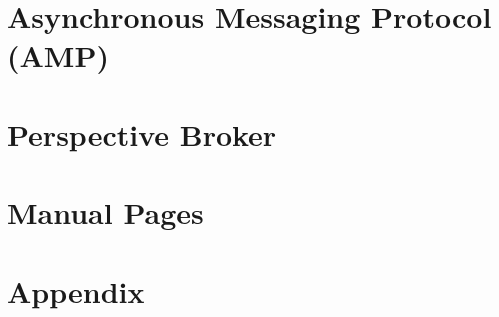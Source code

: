 \documentclass[oneside]{book}
\begin{document}








\chapter{Asynchronous Messaging Protocol (AMP)}




\chapter{Perspective Broker}










\chapter{Manual Pages}


\clearpage

\clearpage

\clearpage



\chapter{Appendix}



\end{document}
